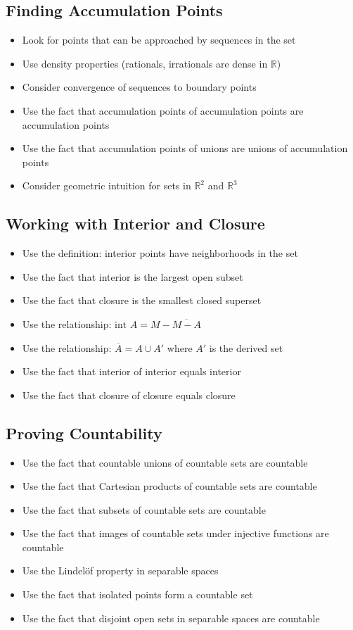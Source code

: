 \subsection*{Finding Accumulation Points}
\begin{itemize}
\item Look for points that can be approached by sequences in the set
\item Use density properties (rationals, irrationals are dense in $\mathbb{R}$)
\item Consider convergence of sequences to boundary points
\item Use the fact that accumulation points of accumulation points are accumulation points
\item Use the fact that accumulation points of unions are unions of accumulation points
\item Consider geometric intuition for sets in $\mathbb{R}^2$ and $\mathbb{R}^3$
\end{itemize}

\subsection*{Working with Interior and Closure}
\begin{itemize}
\item Use the definition: interior points have neighborhoods in the set
\item Use the fact that interior is the largest open subset
\item Use the fact that closure is the smallest closed superset
\item Use the relationship: $\text{int } A = M - \overline{M - A}$
\item Use the relationship: $\overline{A} = A \cup A'$ where $A'$ is the derived set
\item Use the fact that interior of interior equals interior
\item Use the fact that closure of closure equals closure
\end{itemize}

\subsection*{Proving Countability}
\begin{itemize}
\item Use the fact that countable unions of countable sets are countable
\item Use the fact that Cartesian products of countable sets are countable
\item Use the fact that subsets of countable sets are countable
\item Use the fact that images of countable sets under injective functions are countable
\item Use the Lindelöf property in separable spaces
\item Use the fact that isolated points form a countable set
\item Use the fact that disjoint open sets in separable spaces are countable
\end{itemize}

